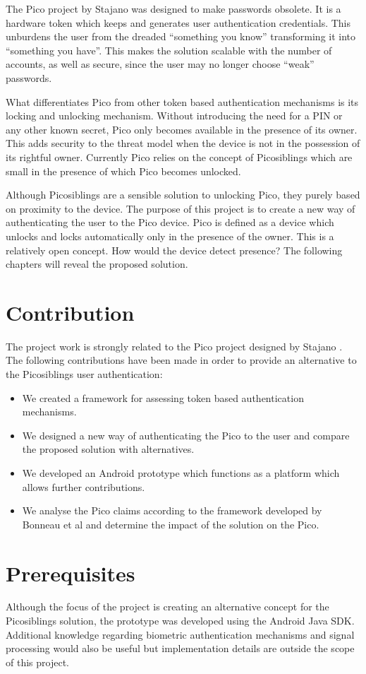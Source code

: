 The Pico project \cite{stajano2011pico} by Stajano was designed to make passwords obsolete. It is a hardware token which keeps and generates user authentication credentials. This unburdens the user from the dreaded ``something you know'' transforming it into ``something you have''. This makes the solution scalable with the number of accounts, as well as secure, since the user may no longer choose ``weak'' passwords. 

What differentiates Pico from other token based authentication mechanisms is its locking and unlocking mechanism. Without introducing the need for a PIN or any other known secret, Pico only becomes available in the presence of its owner. This adds security to the threat model when the device is not in the possession of its rightful owner. Currently Pico relies on the concept of Picosiblings \cite{stannard2012good} which are small in the presence of which Pico becomes unlocked.

Although Picosiblings are a sensible solution to unlocking Pico, they purely based on proximity to the device. The purpose of this project is to create a new way of authenticating the user to the Pico device. Pico is defined as a device which unlocks and locks automatically only in the presence of the owner. This is a relatively open concept. How would the device detect presence? The following chapters will reveal the proposed solution.

\section{Contribution}
The project work is strongly related to the Pico project designed by Stajano \cite{stajano2011pico}. The following contributions have been made in order to provide an alternative to the Picosiblings user authentication:

\begin{itemize}
	\item We created a framework for assessing token based authentication mechanisms.
	\item We designed a new way of authenticating the Pico to the user and compare the proposed solution with alternatives.
	\item We developed an Android prototype which functions as a platform which allows further contributions.
	\item We analyse the Pico claims according to the framework developed by Bonneau et al \cite{bonneau2012quest} and determine the impact of the solution on the Pico.
\end{itemize}	

\section{Prerequisites}
Although the focus of the project is creating an alternative concept for the Picosiblings solution, the prototype was developed using the Android Java SDK. Additional knowledge regarding biometric authentication mechanisms and signal processing would also be useful but implementation details are outside the scope of this project.